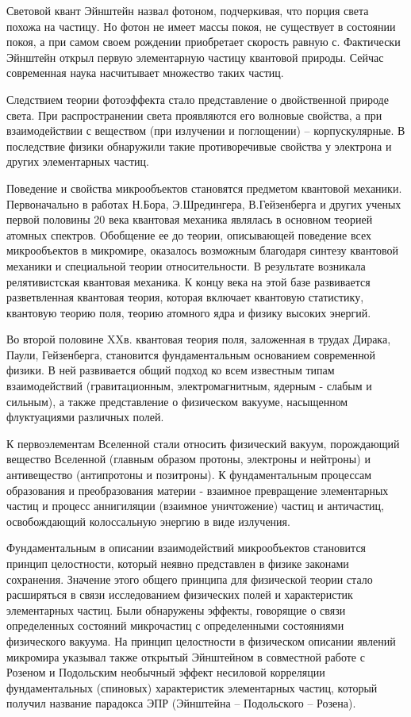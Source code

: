 \documentclass[exam_answers.tex]{subfiles}
\begin{document}
Световой квант Эйнштейн назвал фотоном, подчеркивая, что порция света
похожа на частицу. Но фотон не имеет массы покоя, не существует в состоянии
покоя, а при самом своем рождении приобретает скорость равную с.
Фактически Эйнштейн открыл первую элементарную частицу квантовой
природы. Сейчас современная наука насчитывает множество таких частиц.

Следствием теории фотоэффекта стало представление о двойственной
природе света. При распространении света проявляются его волновые свойства,
а при взаимодействии с веществом (при излучении и поглощении) –
корпускулярные. В последствие физики обнаружили такие противоречивые
свойства у электрона и других элементарных частиц.

Поведение и свойства микрообъектов становятся предметом квантовой
механики. Первоначально в работах Н.Бора, Э.Шредингера, В.Гейзенберга и
других ученых первой половины 20 века квантовая механика являлась в
основном теорией атомных спектров. Обобщение ее до теории, описывающей
поведение всех микрообъектов в микромире, оказалось возможным благодаря
синтезу квантовой механики и специальной теории относительности. В
результате возникала релятивистская квантовая механика. К концу века на
этой базе развивается разветвленная квантовая теория, которая включает
квантовую статистику, квантовую теорию поля, теорию атомного ядра и
физику высоких энергий.

Во второй половине XXв. квантовая теория поля, заложенная в трудах
Дирака, Паули, Гейзенберга, становится фундаментальным основанием
современной физики. В ней развивается общий подход ко всем известным
типам взаимодействий (гравитационным, электромагнитным, ядерным -
слабым и сильным), а также представление о физическом вакууме, насыщенном
флуктуациями различных полей.

К первоэлементам Вселенной стали относить физический вакуум,
порождающий вещество Вселенной (главным образом протоны, электроны и
нейтроны) и антивещество (антипротоны и позитроны). К фундаментальным
процессам образования и преобразования материи - взаимное превращение
элементарных частиц и процесс аннигиляции (взаимное уничтожение) частиц и
античастиц, освобождающий колоссальную энергию в виде излучения.

Фундаментальным в описании взаимодействий микрообъектов становится
принцип целостности, который неявно представлен в физике законами
сохранения. Значение этого общего принципа для физической теории стало
расширяться в связи исследованием физических полей и характеристик
элементарных частиц. Были обнаружены эффекты, говорящие о связи
определенных состояний микрочастиц с определенными состояниями
физического вакуума. На принцип целостности в физическом описании
явлений микромира указывал также открытый Эйнштейном в совместной
работе с Розеном и Подольским необычный эффект несиловой корреляции
фундаментальных (спиновых) характеристик элементарных частиц, который
получил название парадокса ЭПР (Эйнштейна – Подольского – Розена).
\end{document}
